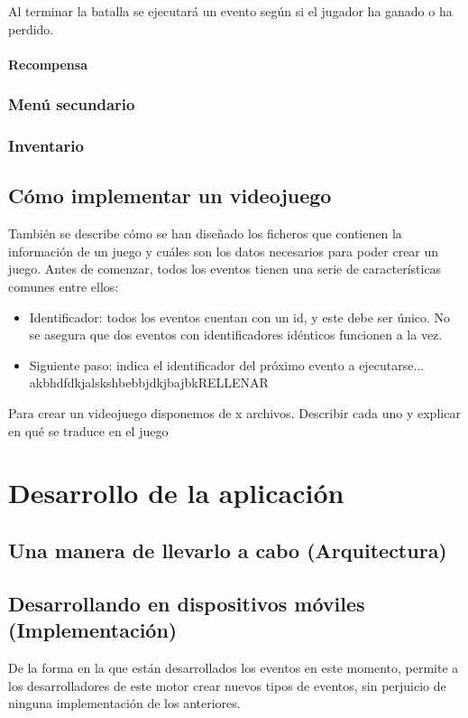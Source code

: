 Al terminar la batalla se ejecutará un evento según si el jugador ha ganado o ha perdido.

\subsubsection{Recompensa}

\subsection{Menú secundario}

\subsection{Inventario}

\section{Cómo implementar un videojuego}

También se describe cómo se han diseñado los ficheros que contienen la información de un juego y cuáles son los datos necesarios para poder crear un juego.
Antes de comenzar, todos los eventos tienen una serie de características comunes entre ellos:

\begin{itemize}
	\item Identificador: todos los eventos cuentan con un id, y este debe ser único. No se asegura que dos eventos con identificadores idénticos funcionen a la vez.
	\item Siguiente paso: indica el identificador del próximo evento a ejecutarse...
	akbhdfdkjalskshbebbjdkjbajbkRELLENAR
\end{itemize}

Para crear un videojuego disponemos de x archivos.
Describir cada uno y explicar en qué se traduce en el juego



\chapter{Desarrollo de la aplicación} \label{applicationImplementation}

\section{Una manera de llevarlo a cabo (Arquitectura)}

\section{Desarrollando en dispositivos móviles (Implementación)}

De la forma en la que están desarrollados los eventos en este momento, permite a los desarrolladores de este motor crear nuevos tipos de eventos, sin perjuicio de ninguna implementación de los anteriores.